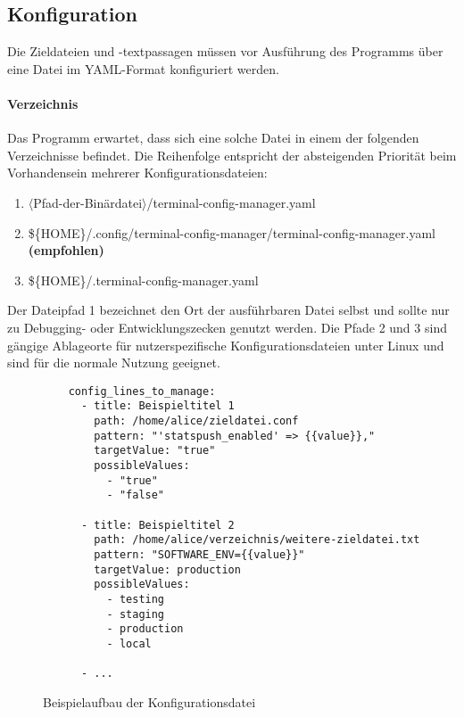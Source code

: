 \subsection{Konfiguration} \label{Konfiguration}
Die Zieldateien und -textpassagen müssen vor Ausführung des Programms
über eine Datei im YAML-Format \cite{yaml} konfiguriert werden.

\paragraph{Verzeichnis}
Das Programm erwartet, dass sich eine solche Datei in einem der folgenden
Verzeichnisse befindet. Die Reihenfolge entspricht der absteigenden Priorität
beim Vorhandensein mehrerer Konfigurationsdateien:

\begin{enumerate}
  \item $\langle$Pfad-der-Binärdatei$\rangle$/terminal-config-manager.yaml
  \item \$\{HOME\}/.config/terminal-config-manager/terminal-config-manager.yaml \textbf{(empfohlen)}
  \item \$\{HOME\}/.terminal-config-manager.yaml
\end{enumerate}

Der Dateipfad 1 bezeichnet den Ort der ausführbaren Datei selbst und sollte nur
zu Debugging- oder Entwicklungszecken genutzt werden. Die Pfade 2 und 3 sind
gängige Ablageorte für nutzerspezifische Konfigurationsdateien unter Linux und
sind für die normale Nutzung geeignet.

\newenvironment{code}{\captionsetup{type=listing}}{}

\begin{figure}
  \caption{Beispielaufbau der Konfigurationsdatei}
  \label{fig:sample-config}
  \begin{verbatim}
    config_lines_to_manage:
      - title: Beispieltitel 1
        path: /home/alice/zieldatei.conf
        pattern: "'statspush_enabled' => {{value}},"
        targetValue: "true"
        possibleValues:
          - "true"
          - "false"

      - title: Beispieltitel 2
        path: /home/alice/verzeichnis/weitere-zieldatei.txt
        pattern: "SOFTWARE_ENV={{value}}"
        targetValue: production
        possibleValues:
          - testing
          - staging
          - production
          - local

      - ...
  \end{verbatim}
\end{figure}

